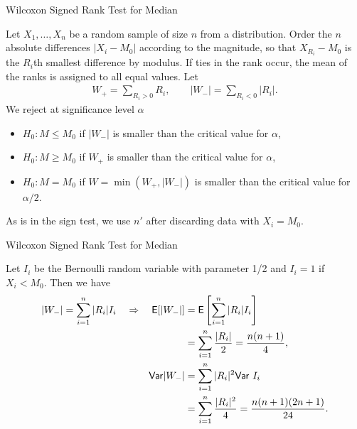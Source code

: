 \begin{frame}{Wilcoxon Signed Rank Test for Median}

\justifying
{} Let $X_1, \ldots, X_n$ be a random sample of size $n$ from a  distribution. Order the $n$ absolute differences $|X_i - M_0|$ according to the magnitude, so that $X_{R_i} - M_0$ is the $R_i$th smallest difference by modulus. If ties in the rank occur, the mean of the ranks is assigned to all equal values. Let
\begin{align*}
W_+ = \sum_{R_i > 0} R_i, \qquad |W_-| = \sum_{R_i < 0} |R_i|.
\end{align*}
We reject at significance level $\alpha$
\begin{itemize}
	\justifying
	\item $H_0: M\leq M_0$ if $|W_-|$ is smaller than the critical value for $\alpha$,
	\item $H_0: M\geq M_0$ if $W_+$ is smaller than the critical value for $\alpha$,
	\item $H_0: M = M_0$ if $W = \min(W_+, |W_-|)$ is smaller than the critical value for $\alpha/2$.
\end{itemize}
As is in the sign test, we use $n'$ after discarding data with $X_i = M_0$.

\end{frame}

\begin{frame}{Wilcoxon Signed Rank Test for Median}

\justifying
{} Let $I_i$ be the Bernoulli random variable with parameter 1/2 and $I_i = 1$ if $X_i < M_0$. Then we have
\begin{align*}
|W_-| = \sum_{i=1}^n |R_i|I_i \quad\Rightarrow\quad \mathsf{E}[|W_-|] & = \mathsf{E}\left[\sum_{i=1}^n |R_i|I_i \right] \\
& = \sum_{i=1}^n \frac{|R_i|}{2} = \frac{n(n+1)}{4}, \\
\mathsf{Var}|W_-| & = \sum_{i=1}^n |R_i|^2\mathsf{Var}\ I_i \\
& = \sum_{i=1}^n \frac{|R_i|^2}{4} = \frac{n(n+1)(2n+1)}{24}.
\end{align*}


\end{frame}


